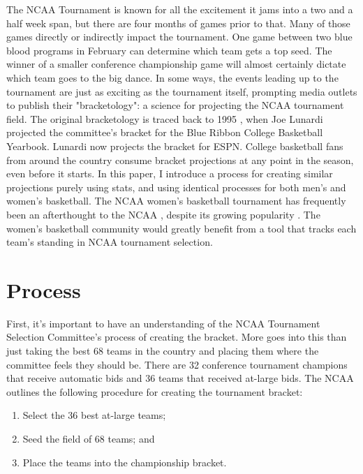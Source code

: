 \documentclass{article}
\begin{document}
The NCAA Tournament is known for all the excitement it jams into a two and a half week span, but there are four months of games prior to that. Many of those games directly or indirectly impact the tournament. One game between two blue blood programs in February can determine which team gets a top seed. The winner of a smaller conference championship game will almost certainly dictate which team goes to the big dance. In some ways, the events leading up to the tournament are just as exciting as the tournament itself, prompting media outlets to publish their "bracketology": a science for projecting the NCAA tournament field. The original bracketology is traced back to 1995 \cite{dietz_bracket_2006}, when Joe Lunardi projected the committee's bracket for the Blue Ribbon College Basketball Yearbook. Lunardi now projects the bracket for ESPN. College basketball fans from around the country consume bracket projections at any point in the season, even before it starts. In this paper, I introduce a process for creating similar projections purely using stats, and using identical processes for both men's and women's basketball. The NCAA women's basketball tournament has frequently been an afterthought to the NCAA \cite{bachman_higgins_2021_ncaaw}, despite its growing popularity \cite{brooks_2022_ncaaw}. The women's basketball community would greatly benefit from a tool that tracks each team's standing in NCAA tournament selection. 

\section{Process}

First, it's important to have an understanding of the NCAA Tournament Selection Committee's process of creating the bracket. More goes into this than just taking the best 68 teams in the country and placing them where the committee feels they should be. There are 32 conference tournament champions that receive automatic bids and 36 teams that received at-large bids. The NCAA outlines the following procedure for creating the tournament bracket:

\begin{enumerate}
	\item Select the 36 best at-large teams;
	\item Seed the field of 68 teams; and
	\item Place the teams into the championship bracket.
\end{enumerate}
\end{document}
